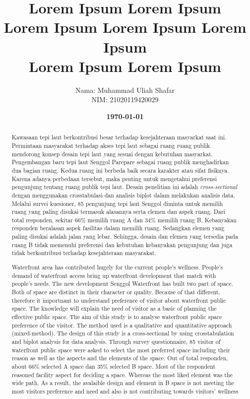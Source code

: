 \documentclass[11pt]{simart} %
\title{
\textbf{Lorem Ipsum Lorem Ipsum \\
Lorem Ipsum Lorem Ipsum Lorem Ipsum} \\
\textbf{{Lorem Ipsum Lorem Ipsum \\}}
} %
\date{\textbf{\today}}
\author{
\begin{tabular}{@{}ll@{}}
	Nama & : Muhammad Uliah Shafar\\
	NIM & : 21020119420029\\
\end{tabular}
}
\begin{document}
\begin{abstract}
Kawasaan tepi laut berkontribusi besar terhadap kesejahteraan masyarkat saat ini. Permintaan masyarakat terhadap akses tepi laut sebagai ruang ruang publik mendorong konsep desain tepi laut yang sesuai dengan kebutuhan masyarkat. Pengembangan baru tepi laut Senggol Parepare sebagai ruang publik menghadirkan dua bagian ruang.
Kedua ruang ini berbeda baik secara karakter atau sifat fisiknya. Karena adanya perbedaan tersebut, maka penting untuk mengetahui preferensi pengunjung tentang ruang publik tepi laut.
Desain penelitian ini adalah \textit{cross-sectional} dengan menggunakan crosstabulasi dan analisis biplot dalam melakukan analisis data. Melalui survei kuesioner, 85 pengunjung tepi laut Senggol diminta untuk memilih ruang yang paling disukai termasuk alasannya serta elemen dan aspek ruang.
Dari total responden, sekitar 66\% memilih ruang A dan 34\% memilih ruang B. Kebanyakan responden beralasan aspek fasilitas dalam memilih ruang. Sedangkan elemen yang paling disukai adalah jalan yang lebar. Sehingga, desain dan elemen yang tersedia pada ruang B tidak memenuhi preferensi dan kebutuhan kebanyakan pengunjung dan juga tidak berkontribusi terhadap kesejahteraan masyarakat.

Waterfront area has contributed hugely for the current people's wellness. People's demand of waterfront access  bring up waterfront development that match with people's needs. The new development Senggol Waterfront has built two part of space. Both of space are distinct in their character or quality. Because of that different, therefore it importnant to understand preference of visitor about waterfront public space.
The knowledge will explain the need of visitor as a basic of planning the effective public space.
The aim of this study is to analyse waterfront public space preference of the visitor.
The method used is a qualitative and quantitative approach (mixed-method).
The design of this study is a cross-sectional by using crosstabulation and biplot analysis for data analysis. Through survey questionnaire, 85 visitor of waterfront public space were asked to select the most preferred space including their reason as well as the aspects and the elements of the space.
Out of total responden, about 66\% selected A space dan 35\% selected B space. Most of the respondent reasoned facility aspect for deciding a space. Whereas the most liked element was the wide path. As a result, the avalaible design and element in B space is not meeting the most visitors preference and need and also is not contributing towards visitors' wellness

\end{abstract}
\end{document}
